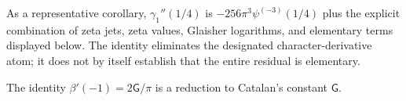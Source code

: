 As a representative corollary, $\gamma_1''(1/4)$ is
$-256\pi^3\psi^{(-3)}(1/4)$ plus the explicit combination of zeta jets,
zeta values, Glaisher logarithms, and elementary terms displayed below.
The identity eliminates the designated character-derivative atom; it does
not by itself establish that the entire residual is elementary.

The identity $\beta'(-1)=2\mathsf G/\pi$ is a reduction to Catalan's
constant $\mathsf G$.
